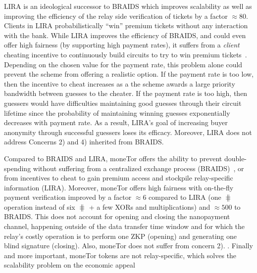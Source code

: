 LIRA is an ideological successor to BRAIDS which improves scalability
as well as improving the efficiency of the relay side verification of tickets by a factor
$\approx 80$. Clients in LIRA probabilistically ``win'' premium tickets without
any interaction with the bank. While LIRA improves the efficiency of BRAIDS, and
could even offer high fairness (by supporting high payment rates), it suffers
from a \textit{client} cheating incentive to continuously build circuits to try
to win premium tickets~\cite{jansen2013lira, jansenblogpost}. Depending on the
chosen value for the payment rate, this problem alone could prevent the scheme
from offering a realistic option. If the payment rate is too low, then the
incentive to cheat increases as a the scheme awards a large priority bandwidth
between guesses to the cheater. If the payment rate is too high, then guessers
would have difficulties maintaining good guesses through their circuit lifetime
since the probability of maintaining winning guesses exponentially decreases
with payment rate. As a result, LIRA's goal of increasing buyer anonymity
through successful guessers loses its efficacy. Moreover, LIRA does not
address Concerns 2) and 4) inherited from BRAIDS.

Compared to BRAIDS and LIRA, moneTor offers the ability to prevent
double-spending without suffering from a centralized exchange process
(BRAIDS)~\cite{jansenblogpost}, or from incentives to cheat to gain premium
access and stockpile relay-specific information (LIRA). Moreover, moneTor offers
high fairness with on-the-fly payment verification improved by a factor $\approx
6$ compared to LIRA (one $\hash$ operation instead of six $\hash$ + a few XORs
and multiplications) and $\approx 500$ to BRAIDS. This does not account for
opening and closing the nanopayment channel, happening outside of the data
transfer time window and for which the relay's costly operation is to perform
one ZKP (opening) and generating one blind signature (closing). Also, moneTor
does not suffer from concern 2).%
.
  Finally and more important, moneTor tokens are not relay-specific, which
  solves the scalability problem on the economic appeal

